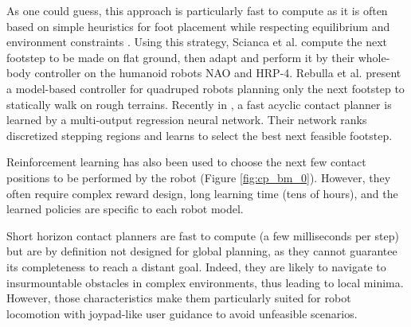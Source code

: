 As one could guess, this approach is particularly fast to compute as it is often based on simple heuristics for foot placement while respecting equilibrium and environment constraints \cite{raibert_heuritics_1986}.
Using this strategy, Scianca et al. \cite{Scianca_2020} compute the next footstep to be made on flat ground, then adapt and perform it by their whole-body controller on the humanoid robots NAO and HRP-4.
Rebulla et al. \cite{rebula_2007_little_dog} present a model-based controller for quadruped robots planning only the next footstep to statically walk on rough terrains.
Recently in \cite{bratta_contact_net_2022}, a fast acyclic contact planner is learned by a multi-output regression neural network. Their network ranks discretized stepping regions and learns to select the best next feasible footstep.

Reinforcement learning has also been used to choose the next few contact positions to be performed by the robot \cite{deepGait, RLOC} (Figure \ref{fig:cp_bm_0}). However, they often require complex reward design, long learning time (tens of hours), and the learned policies are specific to each robot model.

Short horizon contact planners are fast to compute (a few milliseconds per step) but are by definition not designed for global planning, as they cannot guarantee its completeness to reach a distant goal. 
Indeed, they are likely to navigate to insurmountable obstacles in complex environments, thus leading to local minima.
However, those characteristics make them particularly suited for robot locomotion with joypad-like user guidance to avoid unfeasible scenarios.

